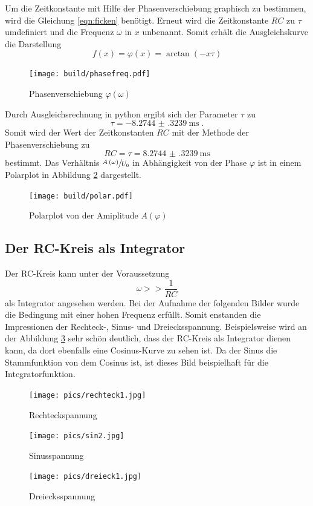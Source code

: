 Um die Zeitkonstante mit Hilfe der Phasenverschiebung graphisch zu bestimmen, wird die Gleichung \eqref{eqn:ficken} benötigt.
Erneut wird die Zeitkonstante $RC$ zu $\tau$ umdefiniert und die Frequenz $\omega$ in $x$ unbenannt.
Somit erhält die Ausgleichskurve die Darstellung 
\begin{equation}
    f \left( x \right) = \varphi \left ( x \right ) = \arctan \left( - x \tau \right)
\end{equation}
\begin{figure}
    \centering
    \caption{Phasenverschiebung $\varphi \left ( \omega \right )$}
    \label{fig:phiw}
    \texttt{[image: build/phasefreq.pdf]}
\end{figure}
Durch Ausgleichsrechnung in python ergibt sich der Parameter $\tau$ zu 
\begin{equation*}
    \tau = \SI{-8.2744(3239)}{\milli\second} \; \text{.}
\end{equation*}
Somit wird der Wert der Zeitkonstanten $RC$ mit der Methode der Phasenverschiebung zu
\begin{equation*}
    RC =     \tau = \SI{8.2744(3239)}{\milli\second}
\end{equation*}
bestimmt. Das Verhältnis $\sfrac{A \left ( \omega \right )}{U_0}$ in Abhängigkeit von der Phase $\varphi$ ist in einem Polarplot in Abbildung \ref{fig:polar} dargestellt.
\begin{figure}
    \centering
    \caption{Polarplot von der Amiplitude $A \left( \varphi \right)$}
    \label{fig:polar}
    \texttt{[image: build/polar.pdf]}
\end{figure}
\newpage
\subsection{Der RC-Kreis als Integrator}
Der RC-Kreis kann unter der Voraussetzung 
\begin{equation}
     \omega >> \frac{1}{RC} 
\end{equation}
als Integrator angesehen  werden.
Bei der Aufnahme der folgenden Bilder wurde die Bedingung mit einer hohen Frequenz erfüllt.
Somit enstanden die Impressionen der Rechteck-, Sinus- und Dreiecksspannung.
Beispielsweise wird an der Abbildung \ref{fig:sin} sehr schön deutlich, dass der RC-Kreis als Integrator dienen kann, da dort ebenfalls eine Cosinus-Kurve 
zu sehen ist. Da der Sinus die Stammfunktion von dem Cosinus ist, ist dieses Bild beispielhaft für die Integratorfunktion.
\begin{figure}
        \centering
        \caption{Rechteckspannung}
        \texttt{[image: pics/rechteck1.jpg]}
\end{figure}
\begin{figure}
    \centering
    \caption{Sinusspannung}
    \label{fig:sin}
    \texttt{[image: pics/sin2.jpg]}
\end{figure}
\begin{figure}
    \centering
    \caption{Dreiecksspannung}
    \texttt{[image: pics/dreieck1.jpg]}
\end{figure}